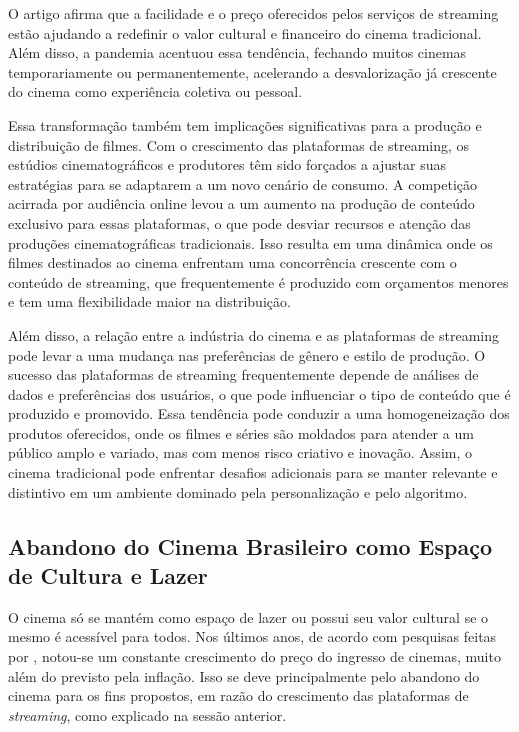 \documentclass[
	article,			%
	12pt,				%
	oneside,			%
	a4paper,			%
	english,			%
	brazil,				%
	sumario=tradicional
	]{abntex2}
\begin{document}
O artigo afirma que a facilidade e o preço oferecidos pelos serviços de streaming estão ajudando a redefinir o valor cultural e financeiro do cinema tradicional. Além disso, a pandemia acentuou essa tendência, fechando muitos cinemas temporariamente ou permanentemente, acelerando a desvalorização já crescente do cinema como experiência coletiva ou pessoal.

Essa transformação também tem implicações significativas para a produção e distribuição de filmes. Com o crescimento das plataformas de streaming, os estúdios cinematográficos e produtores têm sido forçados a ajustar suas estratégias para se adaptarem a um novo cenário de consumo. A competição acirrada por audiência online levou a um aumento na produção de conteúdo exclusivo para essas plataformas, o que pode desviar recursos e atenção das produções cinematográficas tradicionais. Isso resulta em uma dinâmica onde os filmes destinados ao cinema enfrentam uma concorrência crescente com o conteúdo de streaming, que frequentemente é produzido com orçamentos menores e tem uma flexibilidade maior na distribuição.

Além disso, a relação entre a indústria do cinema e as plataformas de streaming pode levar a uma mudança nas preferências de gênero e estilo de produção. O sucesso das plataformas de streaming frequentemente depende de análises de dados e preferências dos usuários, o que pode influenciar o tipo de conteúdo que é produzido e promovido. Essa tendência pode conduzir a uma homogeneização dos produtos oferecidos, onde os filmes e séries são moldados para atender a um público amplo e variado, mas com menos risco criativo e inovação. Assim, o cinema tradicional pode enfrentar desafios adicionais para se manter relevante e distintivo em um ambiente dominado pela personalização e pelo algoritmo.

\subsection{Abandono do Cinema Brasileiro como Espaço de Cultura e Lazer}

O cinema só se mantém como espaço de lazer ou possui seu valor cultural se o mesmo é acessível para todos. Nos últimos anos, de acordo com pesquisas feitas por , notou-se um constante crescimento do preço do ingresso de cinemas, muito além do previsto pela inflação. Isso se deve principalmente pelo abandono do cinema para os fins propostos, em razão do crescimento das plataformas de \textit{streaming}, como explicado na sessão anterior.
\end{document}
